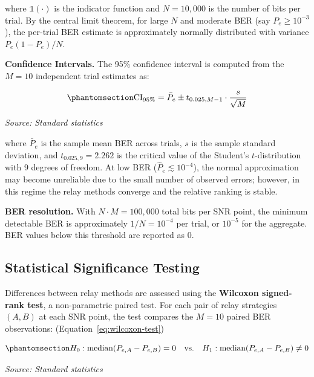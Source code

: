 where \(\mathbb{1}(\cdot)\) is the indicator function and \(N = 10{,}000\) is the number of bits per trial. By the central limit theorem, for large \(N\) and moderate BER (say \(P_e \geq 10^{-3}\)), the per-trial BER estimate is approximately normally distributed with variance \(P_e(1-P_e)/N\).

\textbf{Confidence Intervals.} The 95\% confidence interval is computed from the \(M = 10\) independent trial estimates as:

\begin{equation}\protect\phantomsection\label{eq:confidence-interval}{\text{CI}_{95\%} = \bar{P}_e \pm t_{0.025, M-1} \cdot \frac{s}{\sqrt{M}}
}\end{equation} \par{\small\textit{Source: Standard statistics}}

where \(\bar{P}_e\) is the sample mean BER across trials, \(s\) is the sample standard deviation, and \(t_{0.025, 9} = 2.262\) is the critical value of the Student's \(t\)-distribution with 9 degrees of freedom. At low BER (\(\hat{P}_e \lesssim 10^{-4}\)), the normal approximation may become unreliable due to the small number of observed errors; however, in this regime the relay methods converge and the relative ranking is stable.

\textbf{BER resolution.} With \(N \cdot M = 100{,}000\) total bits per SNR point, the minimum detectable BER is approximately \(1/N = 10^{-4}\) per trial, or \(10^{-5}\) for the aggregate. BER values below this threshold are reported as 0.

\subsection{Statistical Significance Testing}\label{sec:statistical-significance-testing}

Differences between relay methods are assessed using the \textbf{Wilcoxon signed-rank test}, a non-parametric paired test. For each pair of relay strategies \((A, B)\) at each SNR point, the test compares the \(M = 10\) paired BER observations: (Equation~\ref{eq:wilcoxon-test})

\begin{equation}\protect\phantomsection\label{eq:wilcoxon-test}{H_0: \text{median}(P_{e,A} - P_{e,B}) = 0 \quad \text{vs.} \quad H_1: \text{median}(P_{e,A} - P_{e,B}) \neq 0
}\end{equation} \par{\small\textit{Source: Standard statistics}}

